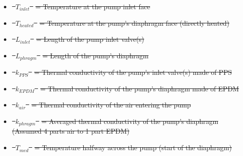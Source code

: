 \documentclass[a4paper,12pt,twoside, final]{article}
\providecommand{\DIFdeltex}[1]{{\protect\color{red}\sout{#1}}}                      %
\providecommand{\DIFdelbegin}{} %
\providecommand{\DIFdel}[1]{\texorpdfstring{\DIFdeltex{#1}}{}} %
\newcommand{\DIFscaledelfig}{0.5}
\newlength{\DIFdelgraphicswidth} %
\newlength{\DIFdelgraphicsheight} %
\newcommand{\DIFdelincludegraphics}[2][]{%
\sbox{\DIFdelgraphicsbox}{\DIFOincludegraphics[#1]{#2}}%
\settoboxwidth{\DIFdelgraphicswidth}{\DIFdelgraphicsbox} %
\settoboxtotalheight{\DIFdelgraphicsheight}{\DIFdelgraphicsbox} %
\scalebox{\DIFscaledelfig}{%
\parbox[b]{\DIFdelgraphicswidth}{\usebox{\DIFdelgraphicsbox}\\[-\baselineskip] \rule{\DIFdelgraphicswidth}{0em}}\llap{\resizebox{\DIFdelgraphicswidth}{\DIFdelgraphicsheight}{%
\setlength{\unitlength}{\DIFdelgraphicswidth}%
\begin{picture}(1,1)%
\thicklines\linethickness{2pt} %
{\color[rgb]{1,0,0}\put(0,0){\framebox(1,1){}}}%
{\color[rgb]{1,0,0}\put(0,0){\line( 1,1){1}}}%
{\color[rgb]{1,0,0}\put(0,1){\line(1,-1){1}}}%
\end{picture}%
}\hspace*{3pt}}} %
} %
\DeclareRobustCommand{\DIFdelbegin}{\DIFOdelbegin \let\includegraphics\DIFdelincludegraphics} %
\begin{document}
\DIFdelbegin %
\begin{itemize}%
\item%
\DIFdel{\mbox{%
$T_{inlet}$
}%
}%
\DIFdel{= Temperature at the pump inlet face
    }%
\item%
\DIFdel{\mbox{%
$T_{heated}$
}%
}%
\DIFdel{= Temperature at the pump's diaphragm face (directly heated)
    }%
\item%
\DIFdel{\mbox{%
$L_{inlet}$
}%
}%
\DIFdel{= Length of the pump inlet valve(s)
    }%
\item%
\DIFdel{\mbox{%
$L_{phragm}$
}%
}%
\DIFdel{= Length of the pump's diaphragm
    }%
\item%
\DIFdel{\mbox{%
$k_{PPS}$
}%
}%
\DIFdel{= Thermal conductivity of the pump's inlet valve(s) made of PPS
    }%
\item%
\DIFdel{\mbox{%
$k_{EPDM}$
}%
}%
\DIFdel{= Thermal conductivity of the pump's diaphragm made of EPDM
    }%
\item%
\DIFdel{\mbox{%
$k_{air}$
}%
}%
\DIFdel{= Thermal conductivity of the air entering the pump
    }%
\item%
\DIFdel{\mbox{%
$k_{phragm}$
}%
}%
\DIFdel{=  Averaged thermal conductivity of the pump's diaphragm (Assumed 4 parts air to 1 part EPDM)
    }%
\item%
\DIFdel{\mbox{%
$T_{med}$
}%
}%
\DIFdel{= Temperature halfway across the pump (start of the diaphragm)
}
\end{itemize}%
\end{document}
